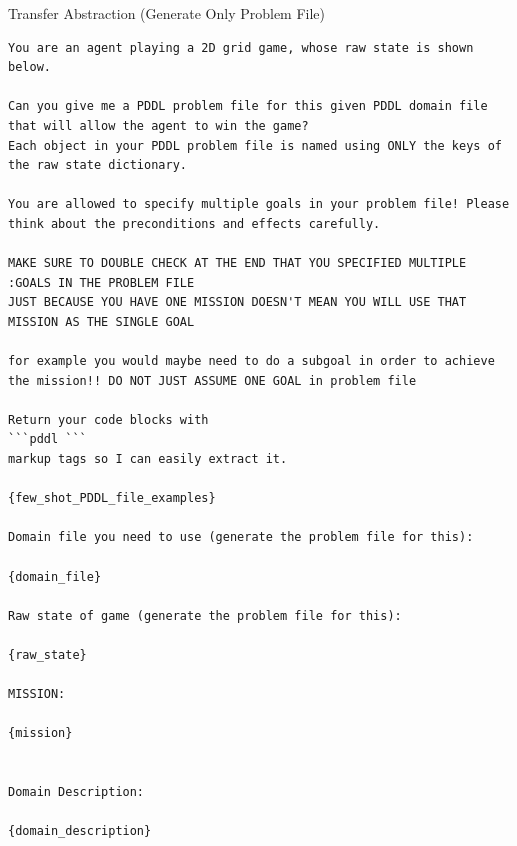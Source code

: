 \documentclass{article}
\theoremstyle{plain}
\theoremstyle{definition}
\theoremstyle{remark}
\begin{document}
\begin{mybox}[boxrule=0pt, parbox=false, opacityframe=1, colframe=black, label=box:transfer_abstraction_prompt]{Transfer Abstraction (Generate Only Problem File)}
\begin{lstlisting}[basicstyle=\ttfamily\small, breaklines=true]
You are an agent playing a 2D grid game, whose raw state is shown below.

Can you give me a PDDL problem file for this given PDDL domain file that will allow the agent to win the game? 
Each object in your PDDL problem file is named using ONLY the keys of the raw state dictionary.

You are allowed to specify multiple goals in your problem file! Please think about the preconditions and effects carefully.

MAKE SURE TO DOUBLE CHECK AT THE END THAT YOU SPECIFIED MULTIPLE :GOALS IN THE PROBLEM FILE
JUST BECAUSE YOU HAVE ONE MISSION DOESN'T MEAN YOU WILL USE THAT MISSION AS THE SINGLE GOAL

for example you would maybe need to do a subgoal in order to achieve the mission!! DO NOT JUST ASSUME ONE GOAL in problem file 

Return your code blocks with
```pddl ```
markup tags so I can easily extract it.

{few_shot_PDDL_file_examples}

Domain file you need to use (generate the problem file for this):

{domain_file}

Raw state of game (generate the problem file for this):

{raw_state}

MISSION:

{mission}


Domain Description:

{domain_description}
\end{lstlisting}
\end{mybox}
\end{document}
